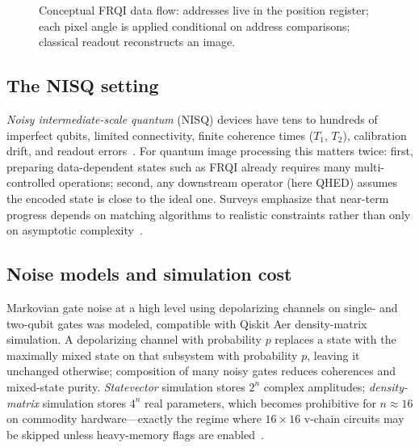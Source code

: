 \begin{figure}[htbp]
\centering
{}
\caption{Conceptual FRQI data flow: addresses live in the position register; each pixel angle is applied conditional on address comparisons; classical readout reconstructs an image.}
\label{fig:frqi-flow}
\end{figure}

\subsection{The NISQ setting}
\emph{Noisy intermediate-scale quantum} (NISQ) devices have tens to hundreds of imperfect qubits, limited connectivity, finite coherence times ($T_1$, $T_2$), calibration drift, and readout errors~\cite{Preskill2018NISQ,Geng2022HybridNISQEdge}. For quantum image processing this matters twice: first, preparing data-dependent states such as FRQI already requires many multi-controlled operations; second, any downstream operator (here QHED) assumes the encoded state is close to the ideal one. Surveys emphasize that near-term progress depends on matching algorithms to realistic constraints rather than only on asymptotic complexity~\cite{Ruan2021OpportunitiesChallenges,Farooq2025SystematicReview}.

\subsection{Noise models and simulation cost}
Markovian gate noise at a high level using depolarizing channels on single- and two-qubit gates was modeled, compatible with Qiskit Aer density-matrix simulation. A depolarizing channel with probability $p$ replaces a state with the maximally mixed state on that subsystem with probability $p$, leaving it unchanged otherwise; composition of many noisy gates reduces coherences and mixed-state purity. \emph{Statevector} simulation stores $2^n$ complex amplitudes; \emph{density-matrix} simulation stores $4^n$ real parameters, which becomes prohibitive for $n\approx 16$ on commodity hardware---exactly the regime where $16\times16$ v-chain circuits may be skipped unless heavy-memory flags are enabled~\cite{NielsenChuang2010}.

